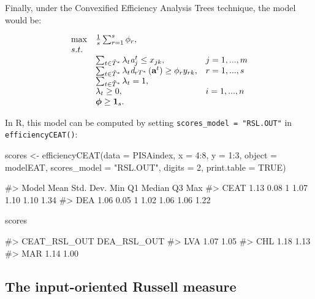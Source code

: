 Finally, under the Convexified Efficiency Analysis Trees technique, the
model would be:

\begin{equation} \label{(22)} 
\begin{array}{lllll} 
{} & {\max } & {\frac{1}{s} \sum_{r=1}^{s}\phi_{r},  } & {} & {} \\ 
{} & {s.t.} & {} & {} & {} \\ 
{} & {} & {\sum_{t\in \tilde{T}^{*} }^{}\lambda_{t} {\it a}_{j}^{t}  \le x_{jk} ,} & {j=1,...,m} & {} \\ 
{} & {} & {\sum_{t\in \tilde{T}^{*} }^{}\lambda_{t} {\it d}_{rT^{*}} \left({\it \textbf{a}}^{t} \right) \ge \phi_{r} y_{rk} ,} & {r=1,...,s} & {} \\ 
{} & {} & {\sum_{t\in \tilde{T}^{*} }^{}\lambda_{t}  =1,} & {} & {} \\ 
{} & {} & {\lambda_{t} \ge 0,} & {i=1,...,n} & {} \\ 
{} & {} & {{\it \boldsymbol{\phi}}\ge {\bf 1}_{s}.} 
\end{array}
\end{equation}

In R, this model can be computed by setting
\texttt{scores\_model\ =\ "RSL.OUT"} in \texttt{efficiencyCEAT()}:

\begin{Schunk}
\begin{Sinput}
scores <- efficiencyCEAT(data = PISAindex, x = 4:8, y = 1:3, object = modelEAT, 
                         scores_model = "RSL.OUT", digits = 2, 
                         print.table = TRUE)
\end{Sinput}
\begin{Soutput}
#>  Model Mean Std. Dev. Min   Q1 Median   Q3  Max
#>   CEAT 1.13      0.08   1 1.07   1.10 1.10 1.34
#>    DEA 1.06      0.05   1 1.02   1.06 1.06 1.22
\end{Soutput}
\begin{Sinput}
scores %>% sample_n(3)
\end{Sinput}
\begin{Soutput}
#>     CEAT_RSL_OUT DEA_RSL_OUT
#> LVA         1.07        1.05
#> CHL         1.18        1.13
#> MAR         1.14        1.00
\end{Soutput}
\end{Schunk}

\hypertarget{the-input-oriented-russell-measure}{%
\subsection{The input-oriented Russell
measure}\label{the-input-oriented-russell-measure}}

